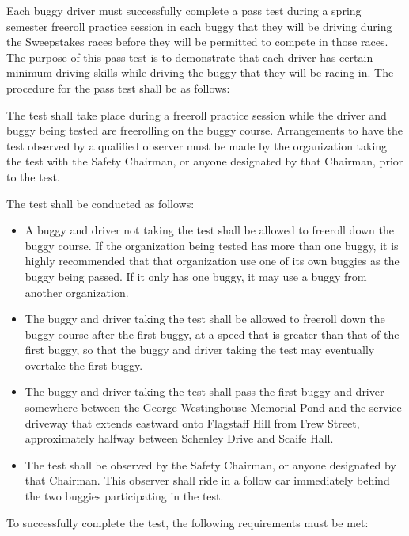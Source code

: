 	Each buggy driver must successfully complete a pass test during a spring semester freeroll practice session in each buggy that they will be driving during the Sweepstakes races before they will be permitted to compete in those races. The purpose of this pass test is to demonstrate that each driver has certain minimum driving skills while driving the buggy that they will be racing in. The procedure for the pass test shall be as follows:
	
	The test shall take place during a freeroll practice session while the driver and buggy being tested are freerolling on the buggy course. Arrangements to have the test observed by a qualified observer must be made by the organization taking the test with the Safety Chairman, or anyone designated by that Chairman, prior to the test.
	
	The test shall be conducted as follows:

	\begin{itemize}

		\item A buggy and driver not taking the test shall be allowed to freeroll down the buggy course. If the organization being tested has more than one buggy, it is highly recommended that that organization  use one of its own buggies as the buggy being passed. If it only has one buggy, it may use a buggy from another organization.

		\item The buggy and driver taking the test shall be allowed to freeroll down the buggy course after the first buggy, at a speed that is greater than that of the first buggy, so that the buggy and driver taking the test may eventually overtake the first buggy.

		\item The buggy and driver taking the test shall pass the first buggy and driver somewhere between the George Westinghouse Memorial Pond and the service driveway that extends eastward onto Flagstaff Hill from Frew Street, approximately halfway between Schenley Drive and Scaife Hall.

		\item The test shall be observed by the Safety Chairman, or anyone designated by that Chairman. This observer shall ride in a follow car immediately behind the two buggies participating in the test.

	\end{itemize}

	\noindent To successfully complete the test, the following requirements must be met:

